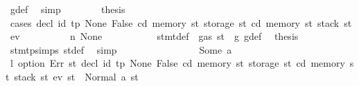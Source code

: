 \begin{isabellebody}
\ g{\isacharunderscore}{\kern0pt}def\ \isamarkupfalse%
\ simp\isanewline
\ \ \ \ \ \ \isamarkupfalse%
\ {\isacharquery}{\kern0pt}thesis\isanewline
\ \ \ \ \ \ \isamarkupfalse%
\ {\isacharparenleft}{\kern0pt}cases\ {\isachardoublequoteopen}decl\ id{}\ tp\ None\ False\ cd\ {\isacharparenleft}{\kern0pt}memory\ st{\isacharprime}{\kern0pt}{\isacharparenright}{\kern0pt}\ {\isacharparenleft}{\kern0pt}storage\ st{\isacharprime}{\kern0pt}{\isacharparenright}{\kern0pt}\ {\isacharparenleft}{\kern0pt}cd{\isacharcomma}{\kern0pt}\ {\isacharparenleft}{\kern0pt}memory\ st{\isacharprime}{\kern0pt}{\isacharparenright}{\kern0pt}{\isacharcomma}{\kern0pt}\ {\isacharparenleft}{\kern0pt}stack\ st{\isacharprime}{\kern0pt}{\isacharparenright}{\kern0pt}{\isacharcomma}{\kern0pt}\ e\isactrlsub v{\isacharparenright}{\kern0pt}{\isachardoublequoteclose}{\isacharparenright}{\kern0pt}\isanewline
\ \ \ \ \ \ \ \ \isamarkupfalse%
\ n{}{\isacharcolon}{\kern0pt}\ None\isanewline
\ \ \ \ \ \ \ \ \isamarkupfalse%
\ {}\ stmt{\isacharunderscore}{\kern0pt}def\ {\isacharbackquoteopen}{\isasymnot}\ gas\ st\ {\isasymle}\ g{\isacharbackquoteclose}\ g{\isacharunderscore}{\kern0pt}def\ \isamarkupfalse%
\ {\isacharquery}{\kern0pt}thesis\ \isamarkupfalse%
\ stmt{\isachardot}{\kern0pt}psimps{\isacharparenleft}{\kern0pt}{}{\isacharparenright}{\kern0pt}\ st{\isacharprime}{\kern0pt}{\isacharunderscore}{\kern0pt}def\ \isamarkupfalse%
\ simp\isanewline
\ \ \ \ \ \ \isamarkupfalse%
\isanewline
\ \ \ \ \ \ \ \ \isamarkupfalse%
\ {\isacharparenleft}{\kern0pt}Some\ a{\isacharparenright}{\kern0pt}\isanewline
\ \ \ \ \ \ \ \ \isamarkupfalse%
\ \isamarkupfalse%
\ l{}{\isacharcolon}{\kern0pt}\ {\isachardoublequoteopen}option\ Err\ {\isacharparenleft}{\kern0pt}{\isasymlambda}st{\isachardot}{\kern0pt}\ decl\ id{}\ tp\ None\ False\ cd\ {\isacharparenleft}{\kern0pt}memory\ st{\isacharparenright}{\kern0pt}\ {\isacharparenleft}{\kern0pt}storage\ st{\isacharparenright}{\kern0pt}\ {\isacharparenleft}{\kern0pt}cd{\isacharcomma}{\kern0pt}\ memory\ st{\isacharcomma}{\kern0pt}\ stack\ st{\isacharcomma}{\kern0pt}\ e\isactrlsub v{\isacharparenright}{\kern0pt}{\isacharparenright}{\kern0pt}\ st{\isacharprime}{\kern0pt}\ {\isacharequal}{\kern0pt}\ Normal\ {\isacharparenleft}{\kern0pt}a{\isacharcomma}{\kern0pt}\ st{\isacharprime}{\kern0pt}{\isacharparenright}{\kern0pt}{\isachardoublequoteclose}\ \isamarkupfalse%

\end{isabellebody}
